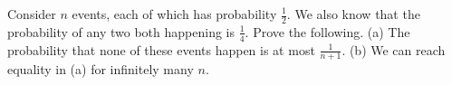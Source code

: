 Consider $n$ events, each of which has probability $\frac12$. We also know that the probability of any two both happening is $\frac14$. Prove the following.
(a) The probability that none of these events happen is at most $\frac1{n+1}$.
(b) We can reach equality in (a) for infinitely many $n$.